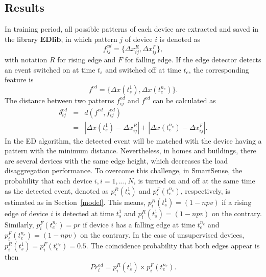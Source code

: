 \subsection{Results}
In training period, all possible patterns of each device are extracted and saved in the library $\mathbf{EDlib}$, in which pattern $j$ of device $i$ is denoted as 
\begin{equation}
f_{ij}^{ed} = \{\Delta x_{ij}^R,\Delta x_{ij}^F\},
\end{equation}
with notation $R$ for rising edge and $F$ for falling edge.
If the edge detector detects an event switched on at time $t_s$ and switched off at time $t_e$, the corresponding feature is
\begin{equation}
f^{ed} = \{\Delta x(t_s^1),\Delta x(t_e^{n_e})\}.
\end{equation}
The distance between two patterns $f_{ij}^{ed}$ and $f^{ed}$ can be calculated as
\begin{eqnarray}\label{eqED1}
\delta_{ij}^{ed} &=& d(f^{ed},f_{ij}^{ed})\nonumber \\
&=&|\Delta x(t_s^1)-\Delta x_{ij}^R|+|\Delta x(t_e^{n_e})-\Delta x_{ij}^F|.
\end{eqnarray}
In the ED algorithm, the detected event will be matched with the device having a pattern with the minimum distance. Nevertheless, in homes and buildings, there are several devices with the same edge height, which decreases the load disaggregation performance. To overcome this challenge, in SmartSense, the probability that each device $i, i=1,\ldots,N$, is turned on and off at the same time as the detected event, denoted as $p_i^R(t_s^1)$ and $p_i^F(t_e^{n_e})$, respectively, is estimated as in Section~\ref{model}. This means, $p_i^R(t_s^1)=(1-npv)$ if a rising edge of device $i$ is detected at time $t_s^1$ and $p_i^R(t_s^1)=(1-npv)$ on the contrary. Similarly, $p_i^F(t_e^{n_e})=pr$ if device $i$ has a falling edge at time $t_e^{n_e}$ and $p_i^F(t_e^{n_e})=(1-npv)$ on the contrary. In the case of unsupervised devices, $p_i^R(t_s^1) = p_i^F(t_e^{n_e}) = 0.5$. The coincidence probability that both edges appear is then
\begin{equation}\label{eqED2}
Pr_i^{ed} = p_i^R(t_s^1)\times p_i^F(t_e^{n_e}).
\end{equation}

